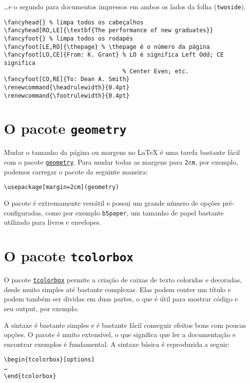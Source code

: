 \documentclass[a4paper]{article}
\newcommand{\code}[1]{\texttt{#1}}
\begin{document}
…e o segundo para documentos impressos em ambos os lados da folha
(\code{twoside}).

\begin{verbatim}
\fancyhead{} % limpa todos os cabeçalhos
\fancyhead[RO,LE]{\textbf{The performance of new graduates}}
\fancyfoot{} % limpa todos os rodapés
\fancyfoot[LE,RO]{\thepage} % \thepage é o número da página
\fancyfoot[LO,CE]{From: K. Grant} % LO é significa Left Odd; CE significa
                                  % Center Even; etc.
\fancyfoot[CO,RE]{To: Dean A. Smith}
\renewcommand{\headrulewidth}{0.4pt}
\renewcommand{\footrulewidth}{0.4pt}
\end{verbatim}

\section{O pacote \code{geometry}}

Mudar o tamanho da página ou margens no LaTeX é uma tarefa bastante fácil com o
pacote \href{https://www.ctan.org/pkg/geometry}{\code{geometry}}. Para mudar
todas as margens para \code{2cm}, por exemplo, podemos carregar o pacote da
seguinte maneira:

\begin{verbatim}
\usepackage[margin=2cm](geometry)
\end{verbatim}

O pacote é extremamente versátil e possui um grande número de opções
pré-configuradas, como por exemplo \code{b5paper}, um tamanho de papel bastante
utilizado para livros e envelopes.

\section{O pacote \code{tcolorbox}}

O pacote \href{https://www.ctan.org/pkg/tcolorbox}{\code{tcolorbox}} permite a
criação de caixas de texto coloridas e decoradas, desde muito simples até
bastante complexas. Elas podem conter um título e podem também ser dividas em
duas partes, o que é útil para mostrar código e seu output, por exemplo.

A sintaxe é bastante simples e é bastante fácil conseguir efeitos bons com
poucas opções. O pacote é muito extensível, o que significa que ler a
documentação e encontrar exemplos é fundamental. A sintaxe básica é reproduzida
a seguir:

\begin{verbatim}
\begin{tcolorbox}[options]
…
\end{tcolorbox}
\end{verbatim}
\end{document}
